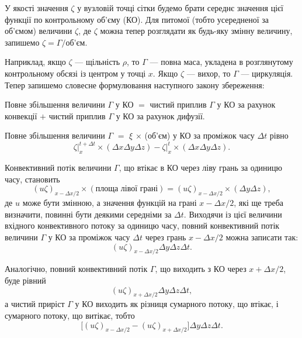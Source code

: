 У якості значення $\zeta$ у вузловій точці сітки будемо брати середнє значення цієї функції по контрольному об'єму (КО). Для питомої (тобто усередненої за об'ємом) величини $\zeta$, де $\zeta$ можна тепер розглядати як будь-яку змінну величину, запишемо $\zeta = \Gamma\text{/об'єм}$. \medskip

Наприклад, якщо $\zeta$ --- щільність $\rho$, то $\Gamma$ --- повна маса, укладена в розглянутому контрольному обсязі із центром у точці $x$. Якщо $\zeta$ --- вихор, то $\Gamma$ --- циркуляція. Тепер запишемо словесне формулювання наступного закону збереження:

\begin{th_law}
    \label{law:control-space}
    Повне збільшення величини $\Gamma$ у КО $=$ чистий приплив $\Gamma$ у КО за рахунок конвекції $+$ чистий приплив $\Gamma$ у КО за рахунок дифузії.
\end{th_law}
    
Повне збільшення величини $\Gamma$ $=$ $\xi$ $\times$ (об'єм) у КО за проміжок часу $\Delta t$ рівно
\begin{equation*}
    \left. \zeta \right|_x^{t + \Delta t} \times (\Delta x \Delta y \Delta z) - \left. \zeta \right|_x^t \times (\Delta x \Delta y \Delta z).
\end{equation*}

Конвективний потік величини $\Gamma$, що втікає в КО через ліву грань за одиницю часу, становить
\begin{equation*}
    (u \zeta)_{x - \Delta x / 2} \times (\text{площа лівої грані}) = (u \zeta)_{x - \Delta x / 2} \times (\Delta y \Delta z),
\end{equation*}
де $u$ може бути змінною, а значення функцій на грані $x - \Delta x / 2$, які ще треба визначити, повинні бути деякими середніми за $\Delta t$. Виходячи із цієї величини вхідного конвективного потоку за одиницю часу, повний конвективний потік величини $\Gamma$ у КО за проміжок часу $\Delta t$ через грань $x - \Delta x / 2$  можна записати так:
\begin{equation*}
    (u \zeta)_{x - \Delta x / 2} \Delta y \Delta z \Delta t.
\end{equation*}

Аналогічно, повний конвективний потік $\Gamma$, що виходить з КО через $x + \Delta x / 2$, буде рівний
\begin{equation*}
    (u \zeta)_{x + \Delta x / 2} \Delta y \Delta z \Delta t,
\end{equation*}
а чистий приріст $\Gamma$ у КО виходить як різниця сумарного потоку, що втікає, і сумарного потоку, що витікає, тобто
\begin{equation*}
    \Big[ (u \zeta)_{x - \Delta x / 2} - (u \zeta)_{x + \Delta x / 2} \Big] \Delta y \Delta z \Delta t.
\end{equation*}

